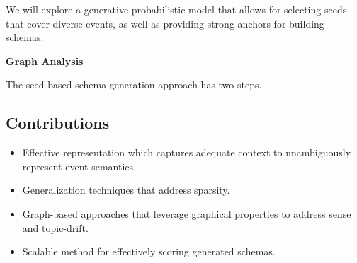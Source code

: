 We will explore a generative probabilistic model that allows for selecting seeds that cover diverse events, as well as providing strong anchors for building schemas. 

\textbf{Graph Analysis} 

The seed-based schema generation approach has two steps.


\subsection{Contributions}

\begin{itemize}
\item Effective representation which captures adequate context to unambiguously represent event semantics. 
\item Generalization techniques that address sparsity. 
\item Graph-based approaches that leverage graphical properties to address sense and topic-drift. 
\item Scalable method for effectively scoring generated schemas. 
\end{itemize}

